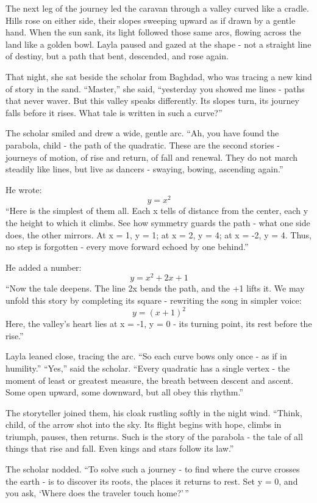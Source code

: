 \documentclass[
  letterpaper,
  DIV=11,
  numbers=noendperiod]{scrreprt}
\begin{document}
The next leg of the journey led the caravan through a valley curved like
a cradle. Hills rose on either side, their slopes sweeping upward as if
drawn by a gentle hand. When the sun sank, its light followed those same
arcs, flowing across the land like a golden bowl. Layla paused and gazed
at the shape - not a straight line of destiny, but a path that bent,
descended, and rose again.

That night, she sat beside the scholar from Baghdad, who was tracing a
new kind of story in the sand. ``Master,'' she said, ``yesterday you
showed me lines - paths that never waver. But this valley speaks
differently. Its slopes turn, its journey falls before it rises. What
tale is written in such a curve?''

The scholar smiled and drew a wide, gentle arc. ``Ah, you have found the
parabola, child - the path of the quadratic. These are the second
stories - journeys of motion, of rise and return, of fall and renewal.
They do not march steadily like lines, but live as dancers - swaying,
bowing, ascending again.''

He wrote: \[
y = x^2
\] ``Here is the simplest of them all. Each x tells of distance from the
center, each y the height to which it climbs. See how symmetry guards
the path - what one side does, the other mirrors. At x = 1, y = 1; at x
= 2, y = 4; at x = -2, y = 4. Thus, no step is forgotten - every move
forward echoed by one behind.''

He added a number: \[
y = x^2 + 2x + 1
\] ``Now the tale deepens. The line 2x bends the path, and the +1 lifts
it. We may unfold this story by completing its square - rewriting the
song in simpler voice: \[
y = (x + 1)^2
\] Here, the valley's heart lies at x = -1, y = 0 - its turning point,
its rest before the rise.''

Layla leaned close, tracing the arc. ``So each curve bows only once - as
if in humility.'' ``Yes,'' said the scholar. ``Every quadratic has a
single vertex - the moment of least or greatest measure, the breath
between descent and ascent. Some open upward, some downward, but all
obey this rhythm.''

The storyteller joined them, his cloak rustling softly in the night
wind. ``Think, child, of the arrow shot into the sky. Its flight begins
with hope, climbs in triumph, pauses, then returns. Such is the story of
the parabola - the tale of all things that rise and fall. Even kings and
stars follow its law.''

The scholar nodded. ``To solve such a journey - to find where the curve
crosses the earth - is to discover its roots, the places it returns to
rest. Set y = 0, and you ask, `Where does the traveler touch home?'\,''
\end{document}
